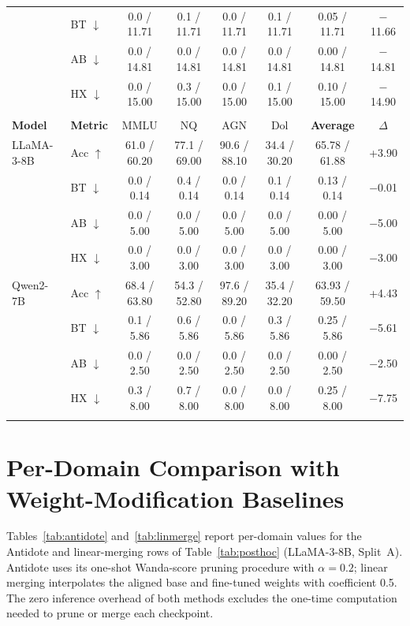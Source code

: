 \begin{table}[htbp]
\begin{tabular}{@{}llcccccc@{}}
 & BT $\downarrow$ & 0.0 / 11.71 & 0.1 / 11.71 & 0.0 / 11.71 & 0.1 / 11.71 & 0.05 / 11.71 & $-$11.66 \\
 & AB $\downarrow$ & 0.0 / 14.81 & 0.0 / 14.81 & 0.0 / 14.81 & 0.0 / 14.81 & 0.00 / 14.81 & $-$14.81 \\
 & HX $\downarrow$ & 0.0 / 15.00 & 0.3 / 15.00 & 0.0 / 15.00 & 0.1 / 15.00 & 0.10 / 15.00 & $-$14.90 \\
\addlinespace
\midrule
\multicolumn{8}{@{}l}{\textbf{Split C}} \\
\textbf{Model} & \textbf{Metric} & MMLU & NQ & AGN & Dol & \textbf{Average} & $\Delta$ \\
\midrule
LLaMA-3-8B & Acc $\uparrow$ & 61.0 / 60.20 & 77.1 / 69.00 & 90.6 / 88.10 & 34.4 / 30.20 & 65.78 / 61.88 & +3.90 \\
 & BT $\downarrow$ & 0.0 / 0.14 & 0.4 / 0.14 & 0.0 / 0.14 & 0.1 / 0.14 & 0.13 / 0.14 & $-$0.01 \\
 & AB $\downarrow$ & 0.0 / 5.00 & 0.0 / 5.00 & 0.0 / 5.00 & 0.0 / 5.00 & 0.00 / 5.00 & $-$5.00 \\
 & HX $\downarrow$ & 0.0 / 3.00 & 0.0 / 3.00 & 0.0 / 3.00 & 0.0 / 3.00 & 0.00 / 3.00 & $-$3.00 \\
\addlinespace
Qwen2-7B & Acc $\uparrow$ & 68.4 / 63.80 & 54.3 / 52.80 & 97.6 / 89.20 & 35.4 / 32.20 & 63.93 / 59.50 & +4.43 \\
 & BT $\downarrow$ & 0.1 / 5.86 & 0.6 / 5.86 & 0.0 / 5.86 & 0.3 / 5.86 & 0.25 / 5.86 & $-$5.61 \\
 & AB $\downarrow$ & 0.0 / 2.50 & 0.0 / 2.50 & 0.0 / 2.50 & 0.0 / 2.50 & 0.00 / 2.50 & $-$2.50 \\
 & HX $\downarrow$ & 0.3 / 8.00 & 0.7 / 8.00 & 0.0 / 8.00 & 0.0 / 8.00 & 0.25 / 8.00 & $-$7.75 \\
\addlinespace
\bottomrule
\end{tabular}
\end{table}

\section{Per-Domain Comparison with Weight-Modification Baselines}
\label{app:posthoc}
Tables~\ref{tab:antidote} and~\ref{tab:linmerge} report per-domain values for the Antidote and linear-merging rows of Table~\ref{tab:posthoc} (LLaMA-3-8B, Split~A). Antidote uses its one-shot Wanda-score pruning procedure with $\alpha{=}0.2$; linear merging interpolates the aligned base and fine-tuned weights with coefficient 0.5. The zero inference overhead of both methods excludes the one-time computation needed to prune or merge each checkpoint.

